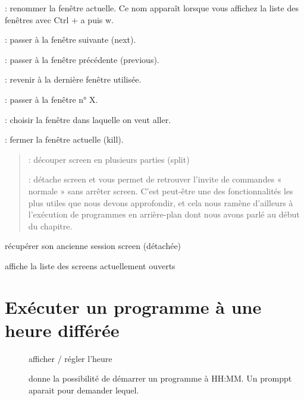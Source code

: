 \documentclass[letterpaper,10pt,french]{sphinxmanual}
\begin{document}
\begin{description}
 : renommer la fenêtre actuelle. Ce nom apparaît lorsque vous affichez la liste des fenêtres avec Ctrl + a puis w.

 : passer à la fenêtre suivante (next).

 : passer à la fenêtre précédente (previous).

 : revenir à la dernière fenêtre utilisée.

 : passer à la fenêtre n° X.

 : choisir la fenêtre dans laquelle on veut aller.

 : fermer la fenêtre actuelle (kill).
\begin{quote}

 : découper screen en plusieurs parties (split)

 : détache screen et vous permet de retrouver l’invite de commandes « normale » sans arrêter screen. C’est peut-être une des fonctionnalités les plus utiles que nous devons approfondir, et cela nous ramène d’ailleurs à l’exécution de programmes en arrière-plan dont nous avons parlé au début du chapitre.
\end{quote}

\item[{\sphinxcode{\sphinxupquote{screen -r}}}] \leavevmode
récupérer son ancienne session screen (détachée)

\item[{\sphinxcode{\sphinxupquote{screen -ls}}}] \leavevmode
affiche la liste des screens actuellement ouverts

\end{description}


\chapter{Exécuter un programme à une heure différée}
\label{\detokenize{07-differe:executer-un-programme-a-une-heure-differee}}\label{\detokenize{07-differe::doc}}\begin{description}
\item[{}] \leavevmode
afficher / régler l’heure

\item[{}] \leavevmode
donne la possibilité de démarrer un programme à HH:MM. Un promppt aparait pour demander lequel.

\end{description}
\end{document}
